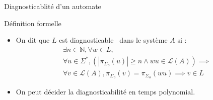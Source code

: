 \documentclass[11pt]{beamer}
\begin{document}
\begin{section}{Diagnosticablit\'e d'un automate}
\begin{frame}{Définition formelle}
\centering
\begin{itemize}
\item On dit que $L$ est diagnosticable~\cite{SamSRST96} dans le système $A$ si :
$$\begin{array}{l}
\exists n \in \mathbb N, \forall w \in L,\\
\forall u \in \Sigma^*, \left(\left|\pi_{\Sigma_o}(u)\right|\ge n \land wu \in \mathcal L(A)\right) \implies\\
\forall v \in \mathcal L(A), \pi_{\Sigma_o}(v)=\pi_{\Sigma_o}(wu) \implies v \in L
\end{array}$$ 
\vspace{1cm}
\pause
\item On peut décider la diagnosticabilité en temps polynomial.
\end{itemize}
\end{frame}


\end{section}
\end{document}
